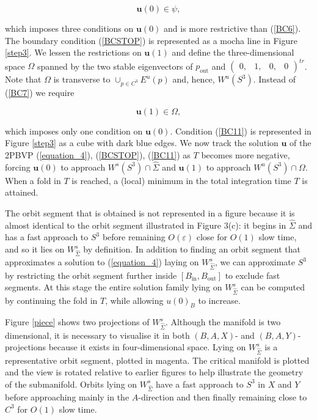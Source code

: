 \documentclass{ws-ijbc}
\begin{document}
    
\begin{equation}
\mathbf{u}(0) \in \psi,
\label{BCSTOP}
\end{equation}
    
\noindent
which imposes three conditions on $\mathbf{u}(0)$ and is more restrictive than (\ref{BC6}).  The boundary condition (\ref{BCSTOP}) is represented as a mocha line in Figure \ref{step3}.  We lessen the restrictions on $\mathbf{u}(1)$ and define the three-dimensional space $\Omega$ spanned by the two stable eigenvectors of $p_{\text{out}}$ and $\begin{pmatrix} 0, & 1, & 0, & 0 \end{pmatrix}^{tr}$.  Note that $\Omega$ is transverse to $\cup_{p \in C^3}E^u(p)$ and, hence, $W^u(S^3)$.  Instead of (\ref{BC7}) we require
    
\begin{equation}
\mathbf{u}(1) \in \Omega,
\label{BC11}
\end{equation}
    
\noindent
which imposes only one condition on $\mathbf{u}(0)$.  Condition (\ref{BC11}) is represented in Figure \ref{step3} as a cube with dark blue edges.  We now track the solution $\mathbf{u}$ of the 2PBVP (\ref{equation_4}), (\ref{BCSTOP}), (\ref{BC11}) as $T$ becomes more negative, forcing $\mathbf{u}(0)$ to approach $W^s(S^3) \cap \widehat{\Sigma}$ and $\mathbf{u}(1)$ to approach $W^u(S^3) \cap \Omega$. When a fold in $T$ is reached, a (local) minimum in the total integration time $T$ is attained.

The orbit segment that is obtained is not represented in a figure because it is almost identical to the orbit segment illustrated in Figure 3(c): it begins in $\widehat{\Sigma}$ and has a fast approach to $S^3$ before remaining $O(\varepsilon)$ close for $O(1)$ slow time, and so it lies on $W^{s}_{\widehat{\Sigma}}$ by definition.  In addition to finding an orbit segment that approximates a solution to (\ref{equation_4}) laying on $W^s_{\widehat{\Sigma}}$, we can approximate $S^3$ by restricting the orbit segment further inside $[B_{\text{in}},B_{\text{out}}]$ to exclude fast segments. At this stage the entire solution family lying on $W^s_{\widehat{\Sigma}}$ can be computed by continuing the fold in $T$, while allowing $u(0)_B$ to increase.

Figure \ref{piece} shows two projections of $W^s_{\widehat{\Sigma}}$.  Although the manifold is two dimensional, it is necessary to visualise it in both $(B,A,X)$- and $(B,A,Y)$-projections because it exists in four-dimensional space.  Lying on $W^s_{\widehat{\Sigma}}$ is a representative orbit segment, plotted in magenta.  The critical manifold is plotted and the view is rotated relative to earlier figures to help illustrate the geometry of the submanifold.  Orbits lying on $W^s_{\widehat{\Sigma}}$ have a fast approach to $S^3$ in $X$ and $Y$ before approaching mainly in the $A$-direction and then finally remaining close to $C^3$ for $O(1)$ slow time.
\end{document}
